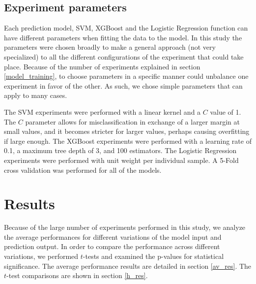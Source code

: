\documentclass[review]{elsarticle}
\makeatletter
\newcommand*{\@rowstyle}{}
\newcommand*{\rowstyle}[1]{%
  \gdef\@rowstyle{#1}%
  \@rowstyle\ignorespaces%
}
\makeatother
\begin{document}

\subsection{Experiment parameters}
\label{params}

Each prediction model, SVM, XGBoost and the Logistic Regression function can have different parameters when fitting the data to the model. In this study the parameters were chosen broadly to make a general approach (not very specialized) to all the different configurations of the experiment that could take place. Because of the number of experiments explained in section \ref{model_training}, to choose parameters in a specific manner could unbalance one experiment in favor of the other. As such, we chose simple parameters that can apply to many cases.

The SVM experiments were performed with a linear kernel and a \(C\) value of 1. The \(C\) parameter allows for misclassification in exchange of a larger margin at small values, and it becomes stricter for larger values, perhaps causing overfitting if large enough. The XGBoost experiments were performed with a learning rate of 0.1, a maximum tree depth of 3, and 100 estimators. The Logistic Regression experiments were performed with unit weight per individual sample. A 5-Fold cross validation was performed for all of the models.

\section{Results}
\label{results}

Because of the large number of experiments performed in this study, we analyze the average performances for different variations of the model input and prediction output. In order to compare the performance across different variations, we performed \(t\)-tests and examined the p-values for statistical significance. The average performance results are detailed in section \ref{av_res}. The \(t\)-test comparisons are shown in section \ref{h_res}.
\end{document}
